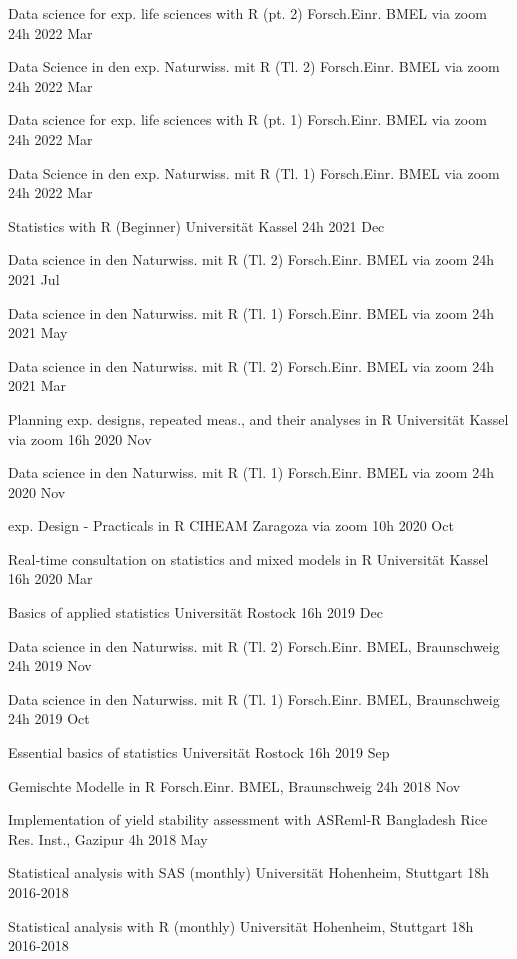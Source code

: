 \documentclass[11pt,a4paper,]{awesome-cv}
\begin{document}
\begin{cvhonors}
\cvhonor
{Data science for exp. life sciences with R (pt. 2)  }
{Forsch.Einr. BMEL via zoom}
{24h}
{2022 Mar  }

\cvhonor
{Data Science in den exp. Naturwiss. mit R (Tl. 2)  }
{Forsch.Einr. BMEL via zoom}
{24h}
{2022 Mar  }

\cvhonor
{Data science for exp. life sciences with R (pt. 1)  }
{Forsch.Einr. BMEL via zoom}
{24h}
{2022 Mar  }

\cvhonor
{Data Science in den exp. Naturwiss. mit R (Tl. 1)  }
{Forsch.Einr. BMEL via zoom}
{24h}
{2022 Mar  }

\cvhonor
{Statistics with R (Beginner)  }
{Universität Kassel}
{24h}
{2021 Dec  }

\cvhonor
{Data science in den Naturwiss. mit R (Tl. 2)  }
{Forsch.Einr. BMEL via zoom}
{24h}
{2021 Jul  }

\cvhonor
{Data science in den Naturwiss. mit R (Tl. 1)  }
{Forsch.Einr. BMEL via zoom}
{24h}
{2021 May  }

\cvhonor
{Data science in den Naturwiss. mit R (Tl. 2)  }
{Forsch.Einr. BMEL via zoom}
{24h}
{2021 Mar  }

\cvhonor
{Planning exp. designs, repeated meas., and their analyses in R  }
{Universität Kassel via zoom}
{16h}
{2020 Nov  }

\cvhonor
{Data science in den Naturwiss. mit R (Tl. 1)  }
{Forsch.Einr. BMEL via zoom}
{24h}
{2020 Nov  }

\cvhonor
{exp. Design - Practicals in R  }
{CIHEAM Zaragoza via zoom}
{10h}
{2020 Oct  }

\cvhonor
{Real‑time consultation on statistics and mixed models in R  }
{Universität Kassel}
{16h}
{2020 Mar  }

\cvhonor
{Basics of applied statistics  }
{Universität Rostock}
{16h}
{2019 Dec  }

\cvhonor
{Data science in den Naturwiss. mit R (Tl. 2)  }
{Forsch.Einr. BMEL, Braunschweig}
{24h}
{2019 Nov  }

\cvhonor
{Data science in den Naturwiss. mit R (Tl. 1)  }
{Forsch.Einr. BMEL, Braunschweig}
{24h}
{2019 Oct  }

\cvhonor
{Essential basics of statistics  }
{Universität Rostock}
{16h}
{2019 Sep  }

\cvhonor
{Gemischte Modelle in R  }
{Forsch.Einr. BMEL, Braunschweig}
{24h}
{2018 Nov  }

\cvhonor
{Implementation of yield stability assessment with ASReml‑R  }
{Bangladesh Rice Res. Inst., Gazipur}
{4h}
{2018 May  }

\cvhonor
{Statistical analysis with SAS (monthly)  }
{Universität Hohenheim, Stuttgart}
{18h}
{2016‑2018  }

\cvhonor
{Statistical analysis with R (monthly)  }
{Universität Hohenheim, Stuttgart}
{18h}
{2016‑2018  }\end{cvhonors}
\end{document}

